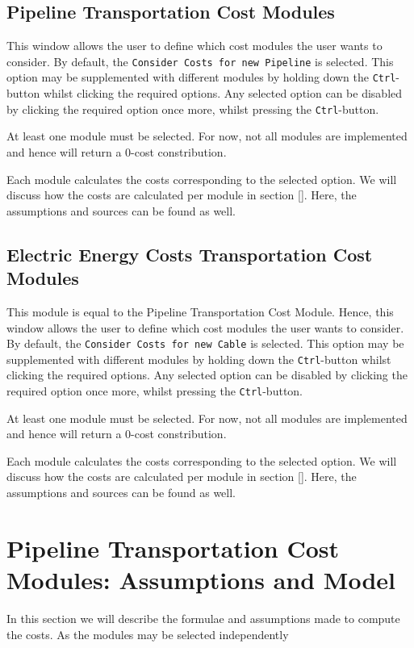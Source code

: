 \documentclass{article}
\begin{document}
\subsection{Pipeline Transportation Cost Modules}
This window allows the user to define which cost modules the user wants to consider. By default, the \texttt{Consider Costs for new Pipeline} is selected. This option may be supplemented with different modules by holding down the \texttt{Ctrl}-button whilst clicking the required options. Any selected option can be disabled by clicking the required option once more, whilst pressing the \texttt{Ctrl}-button. 
\begin{warn}
At least one module must be selected. For now, not all modules are implemented and hence will return a $0$-cost constribution.  
\end{warn}
Each module calculates the costs corresponding to the selected option. We will discuss how the costs are calculated per module in section []. Here, the assumptions and sources can be found as well. 

\subsection{Electric Energy Costs Transportation Cost Modules}
This module is equal to the Pipeline Transportation Cost Module. Hence, this window allows the user to define which cost modules the user wants to consider. By default, the \texttt{Consider Costs for new Cable} is selected. This option may be supplemented with different modules by holding down the \texttt{Ctrl}-button whilst clicking the required options. Any selected option can be disabled by clicking the required option once more, whilst pressing the \texttt{Ctrl}-button. 
\begin{warn}
At least one module must be selected. For now, not all modules are implemented and hence will return a $0$-cost constribution.  
\end{warn}
Each module calculates the costs corresponding to the selected option. We will discuss how the costs are calculated per module in section []. Here, the assumptions and sources can be found as well.

\section{Pipeline Transportation Cost Modules: Assumptions and Model}
In this section we will describe the formulae and assumptions made to compute the costs. As the modules may be selected independently
\end{document}
